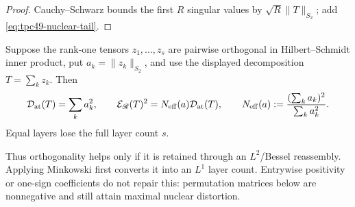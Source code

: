 \begin{proof}
Cauchy--Schwarz bounds the first \(R\) singular values by
\(\sqrt R\|T\|_{S_2}\); add \eqref{eq:tpc49-nuclear-tail}.
\end{proof}

\begin{proposition}
\label{prop:tpc49-orthogonal-layers}
Suppose the rank-one tensors \(z_1,\ldots,z_s\) are pairwise orthogonal
in Hilbert--Schmidt inner product, put \(a_k=\|z_k\|_{S_2}\), and use
the displayed decomposition \(T=\sum_kz_k\).  Then
\begin{equation}
 \mathcal D_{\rm at}(T)=\sum_ka_k^2,
 \qquad
 \mathcal E_{\mathscr R}(T)^2
 =N_{\rm eff}(a)\mathcal D_{\rm at}(T),
 \qquad
 N_{\rm eff}(a):=\frac{(\sum_ka_k)^2}{\sum_ka_k^2}.
 \label{eq:tpc49-orthogonal-layer-loss}
\end{equation}
Equal layers lose the full layer count \(s\).
\end{proposition}

Thus orthogonality helps only if it is retained through an
\(L^2\)/Bessel reassembly.  Applying Minkowski first converts it into
an \(L^1\) layer count.  Entrywise positivity or one-sign coefficients
do not repair this: permutation matrices below are nonnegative and
still attain maximal nuclear distortion.
